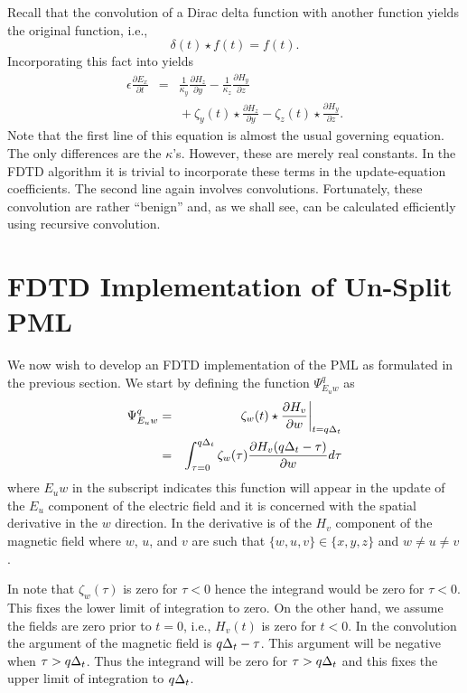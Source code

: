 Recall that the convolution of a Dirac delta function with another
function yields the original function, i.e., 
\begin{equation}
  \delta(t)\star f(t) = f(t).
\end{equation}
Incorporating this fact into  yields
\begin{eqnarray}
  \epsilon \frac{\partial E_x}{\partial t} &=& 
    \frac{1}{\kappa_y} \frac{\partial H_z}{\partial y} - 
    \frac{1}{\kappa_z} \frac{\partial H_y}{\partial z} \nonumber\\
  &&\mbox{} + \zeta_y(t) \star \frac{\partial H_z}{\partial y} - 
    \zeta_z(t) \star \frac{\partial H_y}{\partial z}.
    \label{eq:exInPml}
\end{eqnarray}
Note that the first line of this equation is almost the usual
governing equation.  The only differences are the $\kappa$'s.
However, these are merely real constants.  In the FDTD algorithm it is
trivial to incorporate these terms in the update-equation
coefficients.  The second line again involves convolutions.
Fortunately, these convolution are rather ``benign'' and, as we shall
see, can be calculated efficiently using recursive convolution.

\section{FDTD Implementation of Un-Split PML}

We now wish to develop an FDTD implementation of the PML as formulated
in the previous section.  We start by defining the function
$\Psi_{E_uw}^q$ as
\begin{eqnarray}
  \Psi_{E_uw}^q &=& 
    \left.\zeta_w(t)\star
          \frac{\partial H_v}{\partial w}\right|_{t=q\Delta_t} \\
  &=&
  \int_{\tau=0}^{q\Delta_t}
   \zeta_w(\tau)
          \frac{\partial H_v(q\Delta_t-\tau)}{\partial w} d\tau
  \label{eq:psiFunction}
\end{eqnarray} 
where $E_uw$ in the subscript indicates this function will appear
in the update of the $E_u$ component of the electric field and it is
concerned with the spatial derivative in the $w$ direction.  In
 the derivative is of the $H_v$ component of the
magnetic field where $w$, $u$, and $v$ are such that
$\{w,u,v\}\in\{x,y,z\}$ and $w\neq u\neq v$.

In  note that $\zeta_w(\tau)$ is zero for
$\tau<0$ hence the integrand would be zero for $\tau<0$.  This fixes
the lower limit of integration to zero.  On the other hand, we assume the
fields are zero prior to $t=0$, i.e., $H_v(t)$ is zero for $t<0$.  In
the convolution the argument of the magnetic field is $q\Delta_t-\tau$.
This argument will be negative when $\tau>q\Delta_t$.  Thus the integrand
will be zero for $\tau>q\Delta_t$ and this fixes the upper limit of
integration to $q\Delta_t$.

